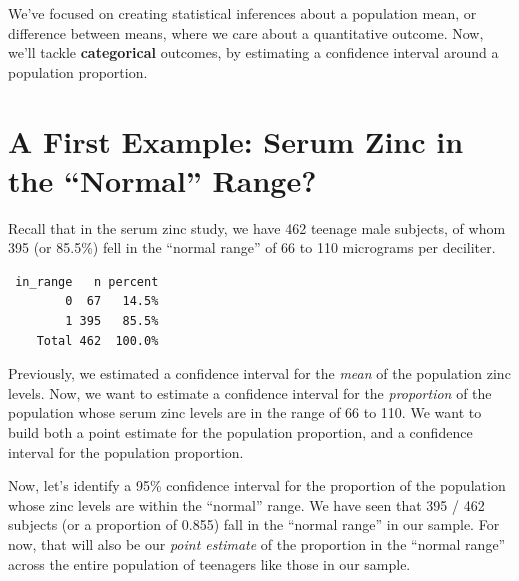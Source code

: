 \documentclass[
]{book}
\newenvironment{Shaded}{\begin{snugshade}}{\end{snugshade}}
\newcommand{\DataTypeTok}[1]{\textcolor[rgb]{0.13,0.29,0.53}{#1}}
\newcommand{\DecValTok}[1]{\textcolor[rgb]{0.00,0.00,0.81}{#1}}
\newcommand{\KeywordTok}[1]{\textcolor[rgb]{0.13,0.29,0.53}{\textbf{#1}}}
\newcommand{\NormalTok}[1]{#1}
\newcommand{\OperatorTok}[1]{\textcolor[rgb]{0.81,0.36,0.00}{\textbf{#1}}}
\newcommand{\StringTok}[1]{\textcolor[rgb]{0.31,0.60,0.02}{#1}}
\begin{document}
We've focused on creating statistical inferences about a population mean, or difference between means, where we care about a quantitative outcome. Now, we'll tackle \textbf{categorical} outcomes, by estimating a confidence interval around a population proportion.

\hypertarget{a-first-example-serum-zinc-in-the-normal-range}{%
\section{A First Example: Serum Zinc in the ``Normal'' Range?}\label{a-first-example-serum-zinc-in-the-normal-range}}

Recall that in the serum zinc study, we have 462 teenage male subjects, of whom 395 (or 85.5\%) fell in the ``normal range'' of 66 to 110 micrograms per deciliter.

\begin{Shaded}
\end{Shaded}

\begin{verbatim}
 in_range   n percent
        0  67   14.5%
        1 395   85.5%
    Total 462  100.0%
\end{verbatim}

Previously, we estimated a confidence interval for the \emph{mean} of the population zinc levels. Now, we want to estimate a confidence interval for the \emph{proportion} of the population whose serum zinc levels are in the range of 66 to 110. We want to build both a point estimate for the population proportion, and a confidence interval for the population proportion.

Now, let's identify a 95\% confidence interval for the proportion of the population whose zinc levels are within the ``normal'' range. We have seen that 395 / 462 subjects (or a proportion of 0.855) fall in the ``normal range'' in our sample. For now, that will also be our \emph{point estimate} of the proportion in the ``normal range'' across the entire population of teenagers like those in our sample.
\end{document}
